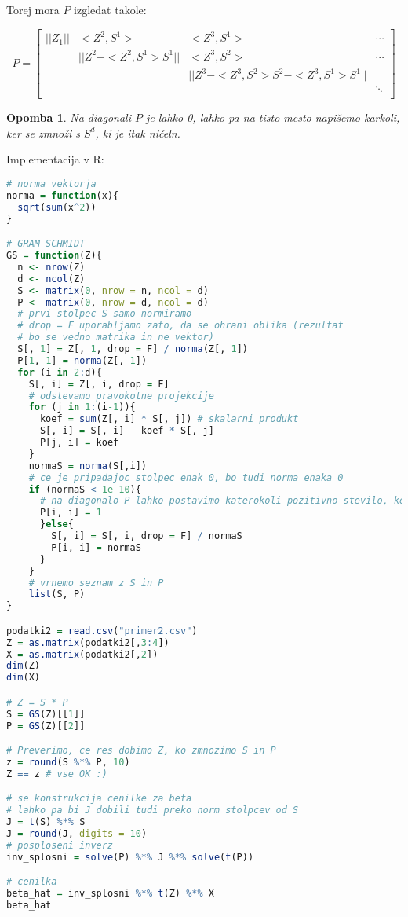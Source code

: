 \documentclass{homework}
\newtheorem{opomba}{Opomba}
\begin{document}
Torej mora $P$ izgledat takole:

\[
  P =
  \left[ {\begin{array}{cccc}
    ||Z_1|| & <Z^2, S^1>& <Z^3, S^1> & \cdots \\
     & || Z^2 - <Z^2, S^1>S^1 || & <Z^3, S^2> & \cdots \\
     &  & || Z^3 - <Z^3, S^2>S^2 - <Z^3, S^1>S^1 || &  \\
     &  &  & \ddots\\
  \end{array} } \right]
\]

\begin{opomba}
  Na diagonali $P$ je lahko 0, lahko pa na tisto mesto napišemo karkoli, ker se zmnoži s $S^d$, ki je itak ničeln.
\end{opomba}

Implementacija v R:

\begin{lstlisting}[language=R]
# norma vektorja
norma = function(x){
  sqrt(sum(x^2))
} 

# GRAM-SCHMIDT 
GS = function(Z){
  n <- nrow(Z)
  d <- ncol(Z)
  S <- matrix(0, nrow = n, ncol = d)
  P <- matrix(0, nrow = d, ncol = d)
  # prvi stolpec S samo normiramo
  # drop = F uporabljamo zato, da se ohrani oblika (rezultat
  # bo se vedno matrika in ne vektor)
  S[, 1] = Z[, 1, drop = F] / norma(Z[, 1])
  P[1, 1] = norma(Z[, 1])
  for (i in 2:d){
    S[, i] = Z[, i, drop = F]
    # odstevamo pravokotne projekcije
    for (j in 1:(i-1)){
      koef = sum(Z[, i] * S[, j]) # skalarni produkt
      S[, i] = S[, i] - koef * S[, j]
      P[j, i] = koef
    }
    normaS = norma(S[,i])
    # ce je pripadajoc stolpec enak 0, bo tudi norma enaka 0
    if (normaS < 1e-10){
      # na diagonalo P lahko postavimo katerokoli pozitivno stevilo, ker se mnozi z 0 (preko S)
      P[i, i] = 1 
      }else{
        S[, i] = S[, i, drop = F] / normaS
        P[i, i] = normaS
      }
    }
    # vrnemo seznam z S in P
    list(S, P)
}

podatki2 = read.csv("primer2.csv")
Z = as.matrix(podatki2[,3:4])
X = as.matrix(podatki2[,2])
dim(Z)
dim(X)

# Z = S * P
S = GS(Z)[[1]]
P = GS(Z)[[2]]

# Preverimo, ce res dobimo Z, ko zmnozimo S in P
z = round(S %*% P, 10)
Z == z # vse OK :)

# se konstrukcija cenilke za beta
# lahko pa bi J dobili tudi preko norm stolpcev od S
J = t(S) %*% S
J = round(J, digits = 10)
# posploseni inverz
inv_splosni = solve(P) %*% J %*% solve(t(P))

# cenilka
beta_hat = inv_splosni %*% t(Z) %*% X
beta_hat
\end{lstlisting}
\end{document}
